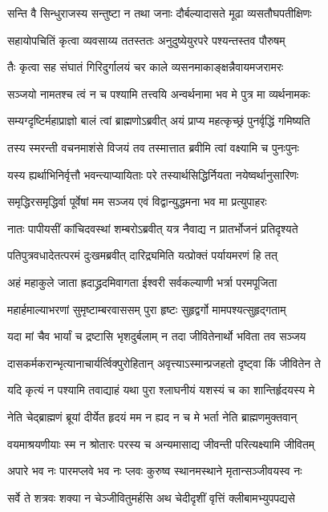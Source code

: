 \twolineshloka
{सन्ति वै सिन्धुराजस्य सन्तुष्टा न तथा जनाः}
{दौर्बल्यादासते मूढा व्यसतौघपतीक्षिणः}


\twolineshloka
{सहायोपचितिं कृत्वा व्यवसाय्य ततस्ततः}
{अनुदुष्येयुरपरे पश्यन्तस्तव पौरुषम्}


\twolineshloka
{तैः कृत्वा सह संघातं गिरिदुर्गालयं चर}
{काले व्यसनमाकाङ्क्षन्नैवायमजरामरः}


\twolineshloka
{सञ्जयो नामतश्च त्वं न च पश्यामि तत्त्वयि}
{अन्वर्थनामा भव मे पुत्र मा व्यर्थनामकः}


\twolineshloka
{सम्यग्दृष्टिर्महाप्राज्ञो बालं त्वां ब्राह्मणोऽब्रवीत्}
{अयं प्राप्य महत्कृच्छ्रं पुनर्वृद्धिं गमिष्यति}


\twolineshloka
{तस्य स्मरन्ती वचनमाशंसे विजयं तव}
{तस्मात्तात ब्रवीमि त्वां वक्ष्यामि च पुनःपुनः}


\twolineshloka
{यस्य ह्यर्थाभिनिर्वृत्तौ भवन्त्याप्यायिताः परे}
{तस्यार्थसिद्धिर्नियता नयेष्वर्थानुसारिणः}


\twolineshloka
{समृद्धिरसमृद्धिर्वा पूर्वेषां मम सञ्जय}
{एवं विद्वान्युद्धमना भव मा प्रत्युपाहरः}


\twolineshloka
{नातः पापीयसीं कांचिदवस्थां शम्बरोऽब्रवीत्}
{यत्र नैवाद्य न प्रातर्भोजनं प्रतिदृश्यते}


\twolineshloka
{पतिपुत्रवधादेतत्परमं दुःखमब्रवीत्}
{दारिद्र्यमिति यत्प्रोक्तं पर्यायमरणं हि तत्}


\twolineshloka
{अहं महाकुले जाता ह्रदाद्ध्रदमिवागता}
{ईश्वरी सर्वकल्याणी भर्त्रा परमपूजिता}


\twolineshloka
{महार्हमाल्याभरणां सुमृष्टाम्बरवाससम्}
{पुरा हृष्टः सुहृद्वर्गो मामपश्यत्सुहृद्गताम्}


\twolineshloka
{यदा मां चैव भार्यां च द्रष्टासि भृशदुर्बलाम्}
{न तदा जीवितेनार्थो भविता तव सञ्जय}


\twolineshloka
{दासकर्मकरान्भृत्यानाचार्यर्त्विक्पुरोहितान्}
{अवृत्त्याऽस्मान्प्रजहतो दृष्ट्वा किं जीवितेन ते}


\twolineshloka
{यदि कृत्यं न पश्यामि तवाद्याहं यथा पुरा}
{श्लाघनीयं यशस्यं च का शान्तिर्हृदयस्य मे}


\twolineshloka
{नेति चेद्ब्राह्मणं ब्रूयां दीर्येत हृदयं मम}
{न ह्यद न च मे भर्ता नेति ब्राह्मणमुक्तवान्}


\twolineshloka
{वयमाश्रयणीयाः स्म न श्रोतारः परस्य च}
{अन्यमासाद्य जीवन्ती परित्यक्ष्यामि जीवितम्}


\twolineshloka
{अपारे भव नः पारमप्लवे भव नः प्लवः}
{कुरुष्व स्थानमस्थाने मृतान्सञ्जीवयस्व नः}


\twolineshloka
{सर्वे ते शत्रवः शक्या न चेञ्जीवितुमर्हसि}
{अथ चेदीदृशीं वृत्तिं क्लीबामभ्युपपद्यसे}


